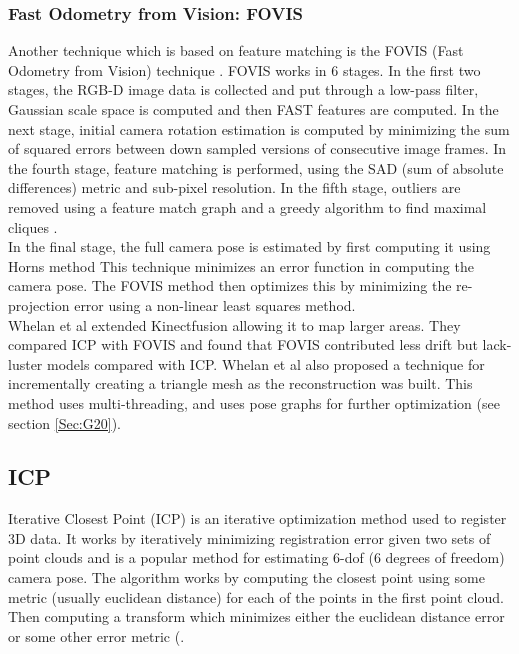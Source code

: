 \subsubsection{Fast Odometry from Vision: FOVIS}

Another technique which is based on feature matching is the FOVIS (Fast Odometry from Vision) technique \cite{Huang17Visual}. FOVIS works in 6 stages. In the first two stages, the RGB-D image data is collected and put through a low-pass filter, Gaussian scale space is computed and then FAST features \cite{Rosten06Machine,Rosten05Fusing} are computed. In the next stage, initial camera rotation estimation is computed by minimizing the sum of squared errors between down sampled versions of consecutive image frames. In the fourth stage, feature matching is performed, using the SAD (sum of absolute differences) metric and sub-pixel resolution. In the fifth stage, outliers are removed using a feature match graph and a greedy algorithm to find maximal cliques \cite{Hirschmuller02Fast,Howard08Real}. \\

In the final stage, the full camera pose is estimated by first computing it using Horns method \cite{Horn87Closed} This technique minimizes an error function in computing the camera pose. The FOVIS method then optimizes this by minimizing the re-projection error using a non-linear least squares method. \\

Whelan et al \cite{Whelan12Kintinuous} extended Kinectfusion allowing it to map larger areas. They compared ICP with FOVIS and found that FOVIS contributed less drift but lack-luster models compared with ICP. Whelan et al also proposed a technique for incrementally creating a triangle mesh as the reconstruction was built. This method uses multi-threading, and uses pose graphs for further optimization (see section \ref{Sec:G20}).

\subsection{ICP}

\label{ICPSection}

Iterative Closest Point (ICP) \cite{Besl92Method,Rusinkiewicz01Efficient,Segal09Generalized} is an iterative optimization method used to register 3D data. It works by iteratively minimizing registration error given two sets of point clouds and is a popular method for estimating 6-dof (6 degrees of freedom) camera pose. The algorithm works by computing the closest point using some metric (usually euclidean distance) for each of the points in the first point cloud. Then computing a transform which minimizes either the euclidean distance error or some other error metric (\cite{Steinbrucker11Real,Tykkala11Direct,Kerl13Robust,Chen92Object,Stuckler12Robust}. \\

